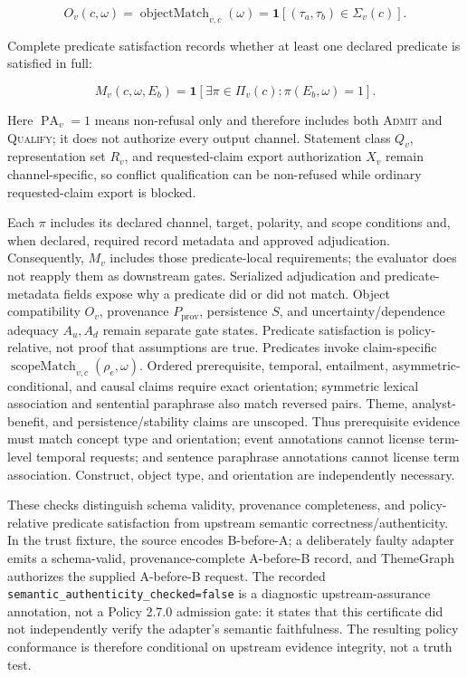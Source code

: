 \documentclass[manuscript,screen,review,anonymous]{acmart}
\begin{document}
\begin{equation}
O_v(c,\omega)=\operatorname{objectMatch}_{v,c}(\omega)=\mathbf{1}[(\tau_a,\tau_b)\in\Sigma_v(c)].
\label{eq:object-match}
\end{equation}

Complete predicate satisfaction records whether at least one declared predicate is satisfied in full:

\begin{equation}
M_v(c,\omega,E_b)=\mathbf{1}[\exists \pi\in\Pi_v(c):\pi(E_b,\omega)=1].
\label{eq:predicate-identifiability}
\end{equation}

Here $\operatorname{PA}_v=1$ means non-refusal only and therefore includes both \textsc{Admit} and \textsc{Qualify}; it does not authorize every output channel. Statement class $Q_v$, representation set $R_v$, and requested-claim export authorization $X_v$ remain channel-specific, so conflict qualification can be non-refused while ordinary requested-claim export is blocked.

Each $\pi$ includes its declared channel, target, polarity, and scope conditions and, when declared, required record metadata and approved adjudication. Consequently, $M_v$ includes those predicate-local requirements; the evaluator does not reapply them as downstream gates. Serialized adjudication and predicate-metadata fields expose why a predicate did or did not match. Object compatibility $O_v$, provenance $P_{\mathrm{prov}}$, persistence $S$, and uncertainty/dependence adequacy $A_u,A_d$ remain separate gate states. Predicate satisfaction is policy-relative, not proof that assumptions are true. Predicates invoke claim-specific $\operatorname{scopeMatch}_{v,c}(\rho_e,\omega)$. Ordered prerequisite, temporal, entailment, asymmetric-conditional, and causal claims require exact orientation; symmetric lexical association and sentential paraphrase also match reversed pairs. Theme, analyst-benefit, and persistence/stability claims are unscoped. Thus prerequisite evidence must match concept type and orientation; event annotations cannot license term-level temporal requests; and sentence paraphrase annotations cannot license term association. Construct, object type, and orientation are independently necessary.

These checks distinguish schema validity, provenance completeness, and policy-relative predicate satisfaction from upstream semantic correctness/authenticity. In the trust fixture, the source encodes B-before-A; a deliberately faulty adapter emits a schema-valid, provenance-complete A-before-B record, and ThemeGraph authorizes the supplied A-before-B request. The recorded \texttt{semantic\_authenticity\_checked=false} is a diagnostic upstream-assurance annotation, not a Policy 2.7.0 admission gate: it states that this certificate did not independently verify the adapter's semantic faithfulness. The resulting policy conformance is therefore conditional on upstream evidence integrity, not a truth test.
\end{document}
